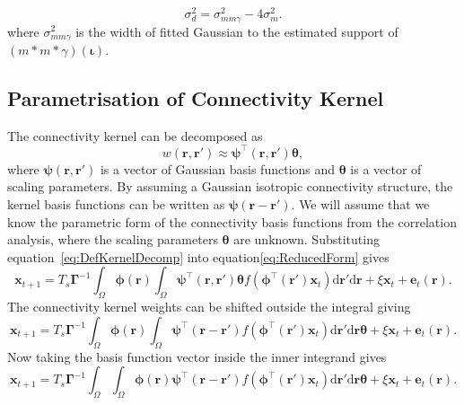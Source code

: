 \documentclass[]{article}
\begin{document}
\begin{equation}
 \sigma_d^2=\sigma_{mm\gamma}^2-4\sigma_m^2.
\end{equation}
where $\sigma_{mm\gamma}^2$ is the width of fitted Gaussian to the estimated support of $(m\ast m\ast\gamma)(\boldsymbol\iota)$.
\subsection{Parametrisation of Connectivity Kernel}
The connectivity kernel can be decomposed as 
\begin{equation}\label{eq:DefKernelDecomp}
	 w\left(\mathbf{r},\mathbf{r}'\right) \approx \boldsymbol{\psi}^\top\left(\mathbf{r},\mathbf{r}'\right) \boldsymbol{\theta},
\end{equation}
where $\boldsymbol{\psi}(\mathbf{r},\mathbf{r}')$ is a vector of Gaussian basis functions and $\boldsymbol{\theta}$ is a vector of scaling parameters. By assuming a Gaussian isotropic connectivity structure, the kernel basis functions can be written as $\boldsymbol{\psi}(\mathbf{r}-\mathbf{r}')$. We will assume that we know the parametric form of the connectivity basis functions from the correlation analysis, where the scaling parameters $\boldsymbol{\theta}$ are unknown.
Substituting equation~\ref{eq:DefKernelDecomp} into equation\ref{eq:ReducedForm} gives
\begin{equation}\label{eq:KernelDecompForm}
	 \mathbf{x}_{t+1} = T_s\boldsymbol{\Gamma}^{-1}
	 \int_\Omega \boldsymbol{\phi}(\mathbf{r}) 
	 \int_\Omega \boldsymbol{\psi}^\top\left(\mathbf{r},\mathbf{r}'\right) \boldsymbol{\theta} f(\boldsymbol{\phi}^{\top} (\mathbf{r}')\mathbf{x}_t) \textrm{d}\mathbf{r}' \textrm{d}\mathbf{r} 
	 + \xi\mathbf{x}_t + \mathbf{e}_t(\mathbf{r}).
\end{equation}
The connectivity kernel weights can be shifted outside the integral giving
\begin{equation}
	 \mathbf{x}_{t+1} = T_s\boldsymbol{\Gamma}^{-1}
	 \int_\Omega \boldsymbol{\phi}(\mathbf{r}) 
	 \int_\Omega \boldsymbol{\psi}^{\top} (\mathbf{r}-\mathbf{r}')f(\boldsymbol{\phi}^{\top}(\mathbf{r}')\mathbf{x}_t) \textrm{d}\mathbf{r}' \textrm{d}\mathbf{r} \boldsymbol{\theta}  
	 + \xi\mathbf{x}_t + \mathbf{e}_t(\mathbf{r}).
\end{equation}
Now taking the basis function vector inside the inner integrand gives
\begin{equation}\label{eq:ReucedFormWithKernelDecomp}
	 \mathbf{x}_{t+1} = T_s\boldsymbol{\Gamma}^{-1}
	 \int_\Omega \int_\Omega \boldsymbol{\phi}(\mathbf{r})\boldsymbol{\psi}^{\top} (\mathbf{r}-\mathbf{r}')f(\boldsymbol{\phi}^{\top}(\mathbf{r}')\mathbf{x}_t) \textrm{d}\mathbf{r}' \textrm{d}\mathbf{r} \boldsymbol{\theta}  
	 + \xi\mathbf{x}_t + \mathbf{e}_t(\mathbf{r}).
\end{equation}
\end{document}
